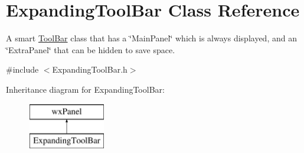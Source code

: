 \hypertarget{class_expanding_tool_bar}{}\section{Expanding\+Tool\+Bar Class Reference}
\label{class_expanding_tool_bar}


A smart \hyperlink{class_tool_bar}{Tool\+Bar} class that has a \char`\"{}\+Main\+Panel\char`\"{} which is always displayed, and an \char`\"{}\+Extra\+Panel\char`\"{} that can be hidden to save space.  




{\ttfamily \#include $<$Expanding\+Tool\+Bar.\+h$>$}

Inheritance diagram for Expanding\+Tool\+Bar\+:\begin{figure}[H]
\begin{center}
\leavevmode
\includegraphics[height=2.000000cm]{class_expanding_tool_bar}
\end{center}
\end{figure}
